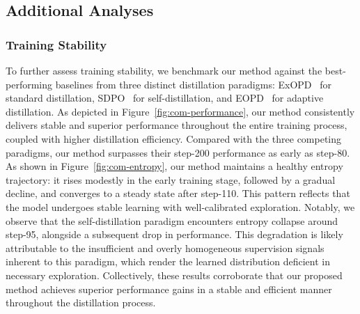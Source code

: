 \documentclass{llmxive}
\begin{document}
\subsection{Additional Analyses}
\subsubsection{Training Stability}
To further assess training stability, we benchmark our method against the best-performing baselines from three distinct distillation paradigms: ExOPD~\citep{yang2026learning} for standard distillation, SDPO~\citep{hubotter2026reinforcement} for self-distillation, and EOPD~\citep{jin2026entropy} for adaptive distillation.
As depicted in Figure~\ref{fig:com-performance}, our method consistently delivers stable and superior performance throughout the entire training process, coupled with higher distillation efficiency. Compared with the three competing paradigms, our method surpasses their step-200 performance as early as step-80.
As shown in Figure~\ref{fig:com-entropy}, our method maintains a healthy entropy trajectory: it rises modestly in the early training stage, followed by a gradual decline, and converges to a steady state after step-110. This pattern reflects that the model undergoes stable learning with well-calibrated exploration.
Notably, we observe that the self-distillation paradigm encounters entropy collapse around step-95, alongside a subsequent drop in performance. This degradation is likely attributable to the insufficient and overly homogeneous supervision signals inherent to this paradigm, which render the learned distribution deficient in necessary exploration.
Collectively, these results corroborate that our proposed method achieves superior performance gains in a stable and efficient manner throughout the distillation process.
\end{document}
